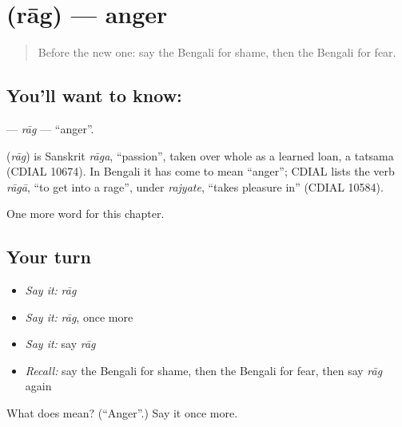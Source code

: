 \section[\texorpdfstring{\bn{রাগ} (rāg)}{রাগ (rāg)}]{ (rāg) — anger}

\label{lesson:BN-C169-rag}



\begin{quote}
Before the new one: say the Bengali for shame, then the Bengali for fear.
\end{quote}

\subsection*{You'll want to know: }
\textbf{} — \emph{rāg} — \textquotedblleft{}anger\textquotedblright{}.

\begin{cousinweb}
\textbf{} (\emph{rāg}) is Sanskrit \emph{rāga}, \textquotedblleft{}passion\textquotedblright{}, taken over whole as a learned loan, a tatsama (CDIAL 10674). In Bengali it has come to mean \textquotedblleft{}anger\textquotedblright{}; CDIAL lists the verb \emph{rāgā}, \textquotedblleft{}to get into a rage\textquotedblright{}, under \emph{rajyate}, \textquotedblleft{}takes pleasure in\textquotedblright{} (CDIAL 10584).
\end{cousinweb}

\begin{grammarlens}[title={What you've built}]
One more word for this chapter.
\end{grammarlens}

\subsection*{Your turn}
\begin{itemize}
\raggedright
  \item \emph{Say it:} \emph{rāg}
  \item \emph{Say it:} \emph{rāg}, once more
  \item \emph{Say it:} say \emph{rāg}
  \item \emph{Recall:} say the Bengali for shame, then the Bengali for fear, then say \emph{rāg} again
\end{itemize}

\begin{tcolorbox}[breakable,colback=teal!4,colframe=teal!35!black,title={Before you move on}]
What does  mean? (\textquotedblleft{}Anger\textquotedblright{}.) Say it once more.
\end{tcolorbox}
